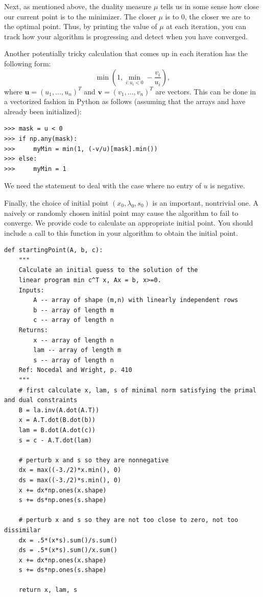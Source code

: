 Next, as mentioned above, the duality measure $\mu$ tells us in some sense how close our current point is to the minimizer.
The closer $\mu$ is to 0, the closer we are to the optimal point.
Thus, by printing the value of $\mu$ at each iteration, you can track how your algorithm is progressing and detect when you have converged.

Another potentially tricky calculation that comes up in each iteration has the following form:
\[
\min\left(1, \displaystyle\min_{i : u_i < 0}-\frac{v_i}{u_i}\right),
\]
where $\mathbf{u} = (u_1, \ldots, u_n)^T$ and $\mathbf{v} = (v_1, \ldots, v_n)^T$ are vectors.
This can be done in a vectorized fashion in Python as follows (assuming that the arrays  and  have already been initialized):
\begin{lstlisting}
>>> mask = u < 0
>>> if np.any(mask):
>>>     myMin = min(1, (-v/u)[mask].min())
>>> else:
>>>     myMin = 1
\end{lstlisting}
We need the  statement to deal with the case where no entry of $u$ is negative.

Finally, the choice of initial point $(x_0, \lambda_0, s_0)$ is an important, nontrivial one.
A naively or randomly chosen initial point may cause the algorithm to fail to converge.
We provide code to calculate an appropriate initial point.
You should include a call to this function in your algorithm to obtain the initial point.

\begin{lstlisting}
def startingPoint(A, b, c):
    """
    Calculate an initial guess to the solution of the
    linear program min c^T x, Ax = b, x>=0.
    Inputs:
        A -- array of shape (m,n) with linearly independent rows
        b -- array of length m
        c -- array of length n
    Returns:
        x -- array of length n
        lam -- array of length m
        s -- array of length n
    Ref: Nocedal and Wright, p. 410
    """
    # first calculate x, lam, s of minimal norm satisfying the primal and dual constraints
    B = la.inv(A.dot(A.T))
    x = A.T.dot(B.dot(b))
    lam = B.dot(A.dot(c))
    s = c - A.T.dot(lam)

    # perturb x and s so they are nonnegative
    dx = max((-3./2)*x.min(), 0)
    ds = max((-3./2)*s.min(), 0)
    x += dx*np.ones(x.shape)
    s += ds*np.ones(s.shape)

    # perturb x and s so they are not too close to zero, not too dissimilar
    dx = .5*(x*s).sum()/s.sum()
    ds = .5*(x*s).sum()/x.sum()
    x += dx*np.ones(x.shape)
    s += ds*np.ones(s.shape)

    return x, lam, s
\end{lstlisting}

